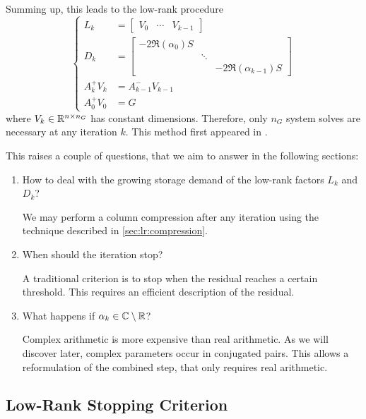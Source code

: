 Summing up,
this leads to the low-rank procedure
\begin{equation}
\label{eq:adi:si-lr-adi}
\left\{
\begin{aligned}
  L_k &= \begin{bmatrix}
    V_0 &
    \cdots &
    V_{k-1}
  \end{bmatrix} \\
  D_k &= \begin{bmatrix}
    -2 \Re(\alpha_0) S \\
    & \ddots \\
    && -2 \Re(\alpha_{k-1}) S
  \end{bmatrix} \\
  A_k^+ V_k &= A_{k-1}^- V_{k-1} \\
  A_0^+ V_0 &= G
\end{aligned}
\right.
\end{equation}
where $V_k \in\mathbb{R}^{n\times n_G}$ has constant dimensions.
Therefore, only $n_G$ system solves are necessary at any iteration $k$.
This method first appeared in \cite[Section~5]{Benner2009}.

This raises a couple of questions,
that we aim to answer in the following sections:
\begin{enumerate}
  \item
    How to deal with the growing storage demand of the low-rank factors $L_k$ and $D_k$?

    We may perform a column compression after any iteration using the technique described in \autoref{sec:lr:compression}.
  \item
    When should the iteration stop?

    A traditional criterion is to stop when the residual reaches a certain threshold.
    This requires an efficient description of the residual.
  \item
    What happens if $\alpha_k\in\mathbb{C}\setminus\mathbb{R}$?

    Complex arithmetic is more expensive than real arithmetic.
    As we will discover later, complex parameters occur in conjugated pairs.
    This allows a reformulation of the combined step,
    that only requires real arithmetic.
\end{enumerate}

\subsection{Low-Rank Stopping Criterion}

